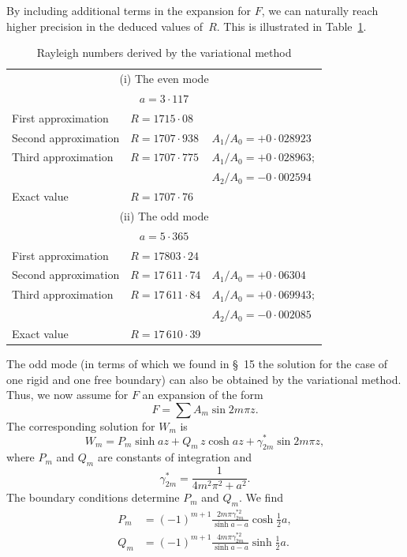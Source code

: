 By including additional terms in the expansion for $F$, we can naturally
reach higher precision in the deduced values of~$R$. This is illustrated
in Table~\ref{tab:2-IV}.

\begin{table}[htbp]
\centering
\caption{Rayleigh numbers derived by the variational method}
\label{tab:2-IV}
\medskip
\begin{tabular}{@{}l l l@{}}
\toprule
\multicolumn{3}{c}{(i) The even mode} \\
\multicolumn{3}{c}{$a = 3{\cdot}117$} \\
\midrule
First approximation  & $R = 1715{\cdot}08$ & \\
Second approximation & $R = 1707{\cdot}938$ & $A_1/A_0 = +0{\cdot}028923$ \\
Third approximation  & $R = 1707{\cdot}775$ & $A_1/A_0 = +0{\cdot}028963;$ \\
                     &                      & $A_2/A_0 = -0{\cdot}002594$ \\
Exact value          & $R = 1707{\cdot}76$  & \\
\midrule
\multicolumn{3}{c}{(ii) The odd mode} \\
\multicolumn{3}{c}{$a = 5{\cdot}365$} \\
\midrule
First approximation  & $R = 17803{\cdot}24$ & \\
Second approximation & $R = 17\,611{\cdot}74$ & $A_1/A_0 = +0{\cdot}06304$ \\
Third approximation  & $R = 17\,611{\cdot}84$ & $A_1/A_0 = +0{\cdot}069943;$ \\
                     &                        & $A_2/A_0 = -0{\cdot}002085$ \\
Exact value          & $R = 17\,610{\cdot}39$ & \\
\bottomrule
\end{tabular}
\end{table}

The odd mode (in terms of which we found in \S~15 the solution for
the case of one rigid and one free boundary) can also be obtained by the
variational method. Thus, we now assume for $F$ an expansion of the
form
\begin{equation}
\label{eq:2-313}
F = \sum A_m \sin 2m\pi z.
\end{equation}
The corresponding solution for $W_m$ is
\begin{equation}
\label{eq:2-314}
W_m = P_m \sinh az + Q_m\,z\cosh az + \gamma_{2m}^*\sin 2m\pi z,
\end{equation}
where $P_m$ and $Q_m$ are constants of integration and
\begin{equation}
\label{eq:2-315}
\gamma_{2m}^* = \frac{1}{4m^2\pi^2 + a^2}.
\end{equation}
The boundary conditions determine $P_m$ and $Q_m$. We find
\begin{equation}
\label{eq:2-316}
\begin{split}
P_m &= (-1)^{m+1}\frac{2m\pi\gamma_{2m}^{*2}}{\sinh a - a}\cosh\tfrac{1}{2}a,\\
Q_m &= (-1)^{m+1}\frac{4m\pi\gamma_{2m}^{*2}}{\sinh a - a}\sinh\tfrac{1}{2}a.
\end{split}
\end{equation}

